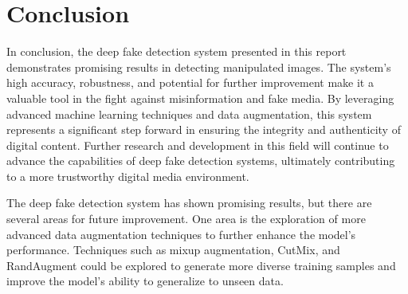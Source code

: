 \section{Conclusion}
\vspace{1.5cm}
In conclusion, the deep fake detection system presented in this report
demonstrates promising results in detecting manipulated images. The
system's high accuracy, robustness, and potential for further
improvement make it a valuable tool in the fight against misinformation
and fake media. By leveraging advanced machine learning techniques
and data augmentation, this system represents a significant step
forward in ensuring the integrity and authenticity of digital content.
Further research and development in this field will continue to advance
the capabilities of deep fake detection systems, ultimately contributing
to a more trustworthy digital media environment.

\vspace{1.0cm}

The deep fake detection system has shown promising results, but there
are several areas for future improvement. One area is the exploration
of more advanced data augmentation techniques to further enhance
the model's performance. Techniques such as mixup augmentation,
CutMix, and RandAugment could be explored to generate more diverse
training samples and improve the model's ability to generalize to
unseen data.